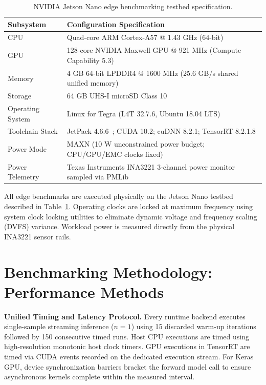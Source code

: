 \documentclass[11pt,a4paper]{article}
\begin{document}
\begin{table}[t]
\centering
\caption{NVIDIA Jetson Nano edge benchmarking testbed specification.}
\label{tab:hardware}
\begin{tabular}{@{}lp{}@{}}
\toprule
Subsystem & Configuration Specification \\
\midrule
CPU & Quad-core ARM Cortex-A57 @ 1.43 GHz (64-bit) \\
GPU & 128-core NVIDIA Maxwell GPU @ 921 MHz (Compute Capability 5.3)~\cite{nvidia2019jetsonnano} \\
Memory & 4 GB 64-bit LPDDR4 @ 1600 MHz (25.6 GB/s shared unified memory) \\
Storage & 64 GB UHS-I microSD Class 10 \\
Operating System & Linux for Tegra (L4T 32.7.6, Ubuntu 18.04 LTS) \\
Toolchain Stack & JetPack 4.6.6~\cite{nvidiajetpackarchive}; CUDA 10.2; cuDNN 8.2.1; TensorRT 8.2.1.8 \\
Power Mode & MAXN (10 W unconstrained power budget; CPU/GPU/EMC clocks fixed) \\
Power Telemetry & Texas Instruments INA3221 3-channel power monitor sampled via PMLib~\cite{barrachina2013integrated} \\
\bottomrule
\end{tabular}
\end{table}

All edge benchmarks are executed physically on the Jetson Nano testbed described in Table~\ref{tab:hardware}. Operating clocks are locked at maximum frequency using system clock locking utilities to eliminate dynamic voltage and frequency scaling (DVFS) variance. Workload power is measured directly from the physical INA3221 sensor rails.

\section{Benchmarking Methodology: Performance Methods}
\label{sec:methodology}

\textbf{Unified Timing and Latency Protocol.} Every runtime backend executes single-sample streaming inference ($n=1$) using 15 discarded warm-up iterations followed by 150 consecutive timed runs. Host CPU executions are timed using high-resolution monotonic host clock timers. GPU executions in TensorRT are timed via CUDA events recorded on the dedicated execution stream. For Keras GPU, device synchronization barriers bracket the forward model call to ensure asynchronous kernels complete within the measured interval.
\end{document}
